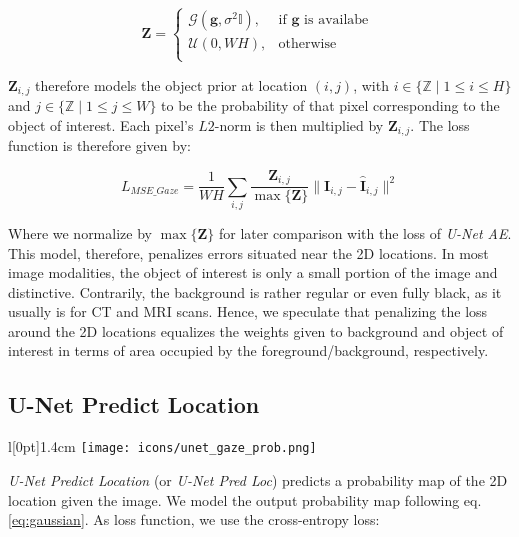 \endgroup

\begin{equation}
\boldsymbol{Z} = 
\begin{cases}
  \mathcal{G}(\boldsymbol{g}, \sigma^2\mathbb{I}),         & \text{if $\bm{g}$ is availabe }\\
  \mathcal{U}(0,WH),& \text{otherwise}\\
\end{cases}
\label{eq:gaussian}
\end{equation}
\hspace{6pt}

$\boldsymbol{Z}_{i,j}$ therefore models the object prior at location $(i,j)$, with $i \in \{\mathbb{Z} \mid 1 \leq i \leq H\}$ and $j \in \{\mathbb{Z} \mid 1 \leq j \leq W\}$ to be the probability of that pixel corresponding to the object of interest. Each pixel's $L2$-norm is then multiplied by $\boldsymbol{Z}_{i,j}$. The loss function is therefore given by:

\begin{equation}
L_{MSE\_Gaze} = \frac{1}{W H} \sum_{i,j} \frac{\boldsymbol{Z}_{i,j}}{\max{\{\boldsymbol{Z}\}}} \|\boldsymbol{I}_{i,j} - \boldsymbol{\hat{I}}_{i,j}\|^2
\label{eq:mse_gaze_loss}
\end{equation}
\hspace{6pt}

Where we normalize by $\max{\{\boldsymbol{Z}\}}$ for later comparison with the loss of \textit{U-Net AE}.
This model, therefore, penalizes errors situated near the 2D locations.
In most image modalities, the object of interest is only a small portion of the image and distinctive.
Contrarily, the background is rather regular or even fully black, as it usually is for CT and MRI scans.
Hence, we speculate that penalizing the loss around the 2D locations equalizes the weights given to background and object of interest in terms of area occupied by the foreground/background, respectively.

\subsection{U-Net Predict Location} \label{sec:unet_pred_loc}

\begin{wrapfigure}[4]{l}[0pt]{1.4cm}
\texttt{[image: icons/unet\_gaze\_prob.png]}
\end{wrapfigure}

\textit{U-Net Predict Location} (or \textit{U-Net Pred Loc}) predicts a probability map of the 2D location given the image.
We model the output probability map following eq. \ref{eq:gaussian}.
As loss function, we use the cross-entropy loss:

